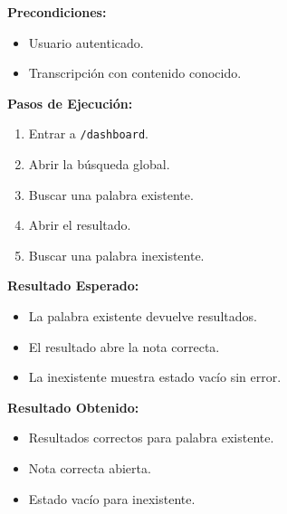 \documentclass[12pt, a4paper]{article}
\newcommand{\prioChip}[2]{%
  \colorbox{#1}{\textcolor{white}{\footnotesize\textbf{#2}}}%
}
\newcommand{\statusChip}[2]{%
  \colorbox{#1}{\textcolor{white}{\footnotesize\textbf{#2}}}%
}
\begin{document}
\vspace{0.3cm}

\begin{tcolorbox}[enhanced, breakable, colback=white, colframe=espe-blue,
  boxrule=1pt, arc=5pt,
  title={\textbf{CP-08} \enspace Buscar dentro de transcripciones \hfill \prioChip{media}{Media} \enspace \statusChip{paso-green}{PASO}},
  fonttitle=\color{white},
  attach boxed title to top left={yshift=-2mm,xshift=4mm},
  boxed title style={colback=espe-blue,arc=3pt}]
\begin{minipage}[t]{0.48\linewidth}
\textbf{Precondiciones:}
\begin{itemize}[noitemsep,topsep=2pt]
  \item Usuario autenticado.
  \item Transcripci\'on con contenido conocido.
\end{itemize}
\textbf{Pasos de Ejecuci\'on:}
\begin{enumerate}[noitemsep,topsep=2pt]
  \item Entrar a \texttt{/dashboard}.
  \item Abrir la b\'usqueda global.
  \item Buscar una palabra existente.
  \item Abrir el resultado.
  \item Buscar una palabra inexistente.
\end{enumerate}
\end{minipage}\hfill
\begin{minipage}[t]{0.48\linewidth}
\textbf{Resultado Esperado:}
\begin{itemize}[noitemsep,topsep=2pt]
  \item La palabra existente devuelve resultados.
  \item El resultado abre la nota correcta.
  \item La inexistente muestra estado vac\'io sin error.
\end{itemize}
\vspace{4pt}
\textbf{Resultado Obtenido:}
\begin{itemize}[noitemsep,topsep=2pt]
  \item[$\checkmark$] Resultados correctos para palabra existente.
  \item[$\checkmark$] Nota correcta abierta.
  \item[$\checkmark$] Estado vac\'io para inexistente.
\end{itemize}
\end{minipage}
\end{tcolorbox}
\end{document}
